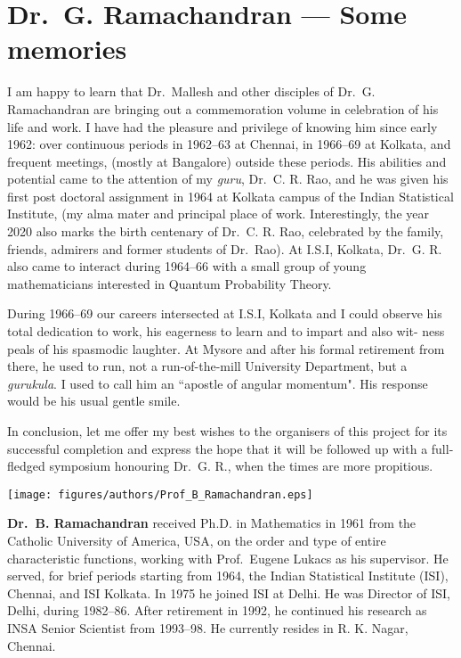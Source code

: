 \chapter{Dr.\ G. Ramachandran --- Some memories}\label{chap24}



I am happy to learn that Dr.\ Mallesh and other disciples of Dr.\ G. Ramachandran are bringing out a commemoration volume in celebration of his life
and work. I have had the pleasure and privilege of knowing him since early
1962: over continuous periods in 1962--63 at Chennai, in 1966--69 at Kolkata,
and frequent meetings, (mostly at Bangalore) outside these periods. His abilities and potential came 
to the attention of my \textit{guru}, Dr.\ C. R. Rao, and he was
given his first post doctoral assignment in 1964 at Kolkata campus of the Indian
Statistical Institute, (my alma mater and principal place of work. Interestingly,
the year 2020 also marks the birth centenary of Dr.\ C. R. Rao, celebrated by
the family, friends, admirers and former students of Dr.\ Rao). At I.S.I, Kolkata,
Dr.\ G. R. also came to interact during 1964--66 with a small group of young
mathematicians interested in Quantum Probability Theory.

During 1966--69 our careers intersected at I.S.I, Kolkata and I could observe
his total dedication to work, his eagerness to learn and to impart and also wit-
ness peals of his spasmodic laughter. At Mysore and after his formal retirement
from there, he used to run, not a run-of-the-mill University Department, but a
\textit{gurukula}. I used to call him an ``apostle of angular momentum". His response
would be his usual gentle smile.


In conclusion, let me offer my best wishes to the organisers of this project
for its successful completion and express the hope that it will be followed up
with a full-fledged symposium honouring Dr.\ G. R., when the times are more
propitious.

\centerline{\texttt{[image: figures/authors/Prof\_B\_Ramachandran.eps]}}
\smallskip

\bigskip

\noindent
\textbf{Dr.\ B. Ramachandran} received Ph.D. in Mathematics in 1961 from the Catholic University of America, 
USA, on the order and type of entire characteristic functions, working with 
Prof.\ Eugene Lukacs as his supervisor. He served, for brief periods starting from 1964, the Indian 
Statistical Institute (ISI), Chennai, and ISI Kolkata. In 1975 he joined ISI at Delhi. He was Director of 
ISI, Delhi, during 1982--86. After retirement in 1992, he continued his research as INSA Senior Scientist 
from 1993--98. He currently resides in R. K. Nagar, Chennai.
